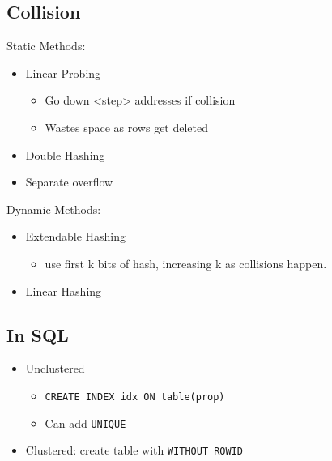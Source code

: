 \documentclass[landscape, letterpaper]{extarticle}
\begin{document}
\begin{multicols}{3}
    \subsection*{Collision}
    Static Methods:
    \begin{itemize}[noitemsep,nolistsep]
        \item Linear Probing
              \begin{itemize}[noitemsep,nolistsep]
                  \item Go down <step> addresses if collision
                  \item Wastes space as rows get deleted
              \end{itemize}
        \item Double Hashing
        \item Separate overflow
    \end{itemize}
    Dynamic Methods:
    \begin{itemize}[noitemsep,nolistsep]
        \item Extendable Hashing
              \begin{itemize}[noitemsep,nolistsep]
                  \item use first k bits of hash, increasing k as collisions happen.
              \end{itemize}
        \item Linear Hashing
    \end{itemize}
    \subsection*{In SQL}
    \begin{itemize}[noitemsep,nolistsep]
        \item Unclustered
              \begin{itemize}[noitemsep,nolistsep]
                  \item \verb|CREATE INDEX idx ON table(prop)|
                  \item Can add \verb|UNIQUE|
              \end{itemize}
        \item Clustered: create table with \verb|WITHOUT ROWID|
    \end{itemize}

\end{multicols}
\end{document}
